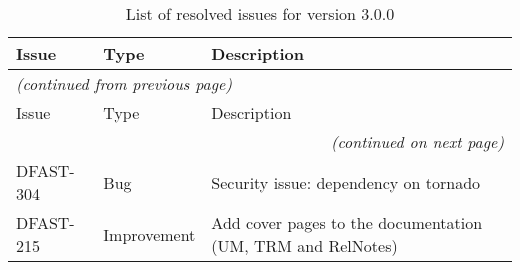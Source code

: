 \documentclass[git]{deltares_manual}
\begin{document}
\begin{longtable}{l|l|p{8cm}}
\caption{List of resolved issues for version 3.0.0} \\
Issue & Type & Description \\ \hline
\endfirsthead
\multicolumn{3}{l}{\textsl{(continued from previous page)}} \\
Issue & Type & Description \\ \hline
\endhead
\hline \multicolumn{3}{r}{\textsl{(continued on next page)}} \\
\endfoot
\endlastfoot 
DFAST-304 & Bug & Security issue: dependency on tornado \\
DFAST-215 & Improvement & Add cover pages to the documentation (UM, TRM and RelNotes) \\
\end{longtable}

\pagestyle{empty}
\cleardoublepage
\mbox{}
\end{document}
